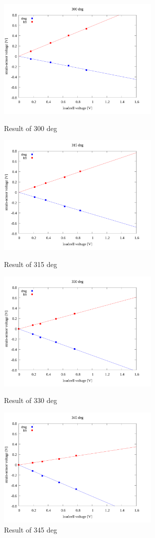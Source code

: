 \documentclass[twocolumn,a4j]{jsarticle}
\begin{document}
\begin{figure}[htbp]
    \footnotesize
    \begin{center}
        \includegraphics[width=78mm]{../images/linear/300_linear.png}
        \caption{Result of 300 deg}
        \includegraphics[width=78mm]{../images/linear/315_linear.png}
        \caption{Result of 315 deg}
        \includegraphics[width=78mm]{../images/linear/330_linear.png}
        \caption{Result of 330 deg}
        \includegraphics[width=78mm]{../images/linear/345_linear.png}
        \caption{Result of 345 deg}
    \end{center}
\end{figure}
\end{document}
